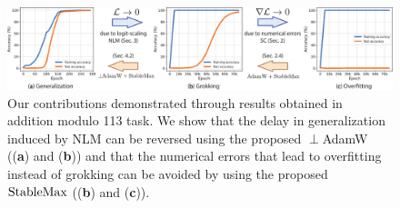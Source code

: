 \begin{figure}[t]
\begin{centering}
    \includegraphics[width=\linewidth]{grokking_iclr_arxiv/figures/grokking.pdf}\vspace{-6mm}
\end{centering}
\caption{Our contributions demonstrated through results obtained in addition modulo 113 task. We show that the delay in generalization induced by NLM can be reversed using the proposed $\perp$\!AdamW ((\textbf{a}) and (\textbf{b})) and that the numerical errors that lead to overfitting instead of grokking can be avoided by using the proposed $\mathrm{StableMax}$ ((\textbf{b}) and (\textbf{c})). \vspace{-5mm}}
\label{fig:teaser}
\end{figure}

